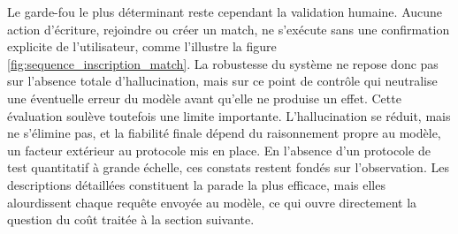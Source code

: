 \documentclass[12pt]{article}
\begin{document}
\vspace{0.2cm}
Le garde-fou le plus déterminant reste cependant la validation humaine. Aucune action d'écriture, rejoindre ou créer un match, ne s'exécute sans une confirmation explicite de l'utilisateur, comme l'illustre la figure \ref{fig:sequence_inscription_match}. La robustesse du système ne repose donc pas sur l'absence totale d'hallucination, mais sur ce point de contrôle qui neutralise une éventuelle erreur du modèle avant qu'elle ne produise un effet.
\newline\newline
Cette évaluation soulève toutefois une limite importante. L'hallucination se réduit, mais ne s'élimine pas, et la fiabilité finale dépend du raisonnement propre au modèle, un facteur extérieur au protocole mis en place. En l'absence d'un protocole de test quantitatif à grande échelle, ces constats restent fondés sur l'observation. Les descriptions détaillées constituent la parade la plus efficace, mais elles alourdissent chaque requête envoyée au modèle, ce qui ouvre directement la question du coût traitée à la section suivante.
\end{document}
